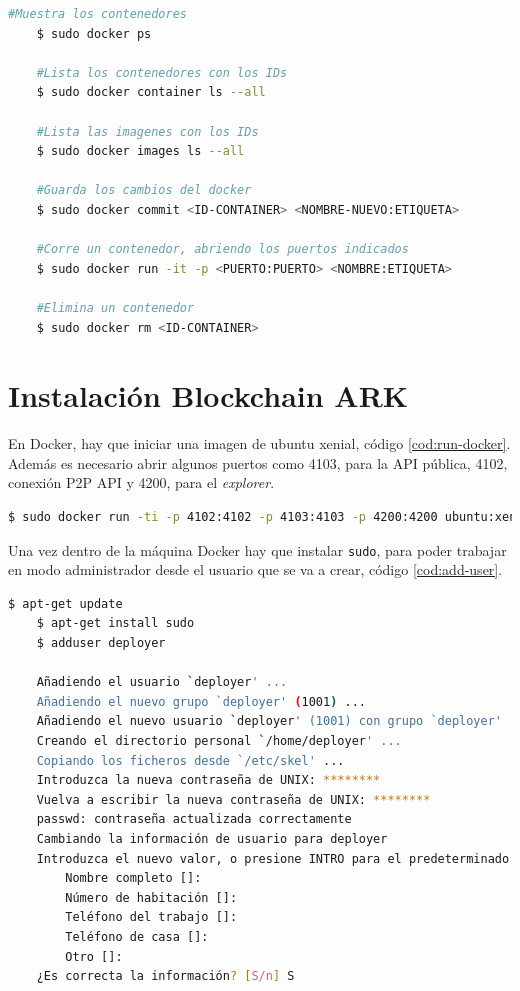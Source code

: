 \begin{lstlisting}[language=Bash,caption=Comandos útiles de Docker, label=cod:cm-docker]
	#Muestra los contenedores
	$ sudo docker ps

	#Lista los contenedores con los IDs
	$ sudo docker container ls --all

	#Lista las imagenes con los IDs
	$ sudo docker images ls --all 

	#Guarda los cambios del docker
	$ sudo docker commit <ID-CONTAINER> <NOMBRE-NUEVO:ETIQUETA>

	#Corre un contenedor, abriendo los puertos indicados
	$ sudo docker run -it -p <PUERTO:PUERTO> <NOMBRE:ETIQUETA>

	#Elimina un contenedor
	$ sudo docker rm <ID-CONTAINER>
\end{lstlisting}

\section{Instalación Blockchain ARK}

En Docker, hay que iniciar una imagen de ubuntu xenial, código \ref{cod:run-docker}. Además es necesario abrir algunos puertos como 4103, para la API pública, 4102, conexión P2P API y 4200, para el \textit{explorer}.\\

\begin{lstlisting}[language=Bash,caption=Instalación \textit{blockchain}. Parte I, label=cod:run-docker, style=Consola]
	$ sudo docker run -ti -p 4102:4102 -p 4103:4103 -p 4200:4200 ubuntu:xenial
\end{lstlisting}

Una vez dentro de la máquina Docker hay que instalar \texttt{sudo}, para poder trabajar en modo administrador desde el usuario que se va a crear, código \ref{cod:add-user}.\\

\begin{lstlisting}[language=Bash,caption=Instalación \textit{blockchain}. Parte II, label=cod:add-user, style=Consola]
	$ apt-get update
	$ apt-get install sudo
	$ adduser deployer

	Añadiendo el usuario `deployer' ...
	Añadiendo el nuevo grupo `deployer' (1001) ...
	Añadiendo el nuevo usuario `deployer' (1001) con grupo `deployer' ...
	Creando el directorio personal `/home/deployer' ...
	Copiando los ficheros desde `/etc/skel' ...
	Introduzca la nueva contraseña de UNIX: ********
	Vuelva a escribir la nueva contraseña de UNIX: ********
	passwd: contraseña actualizada correctamente
	Cambiando la información de usuario para deployer
	Introduzca el nuevo valor, o presione INTRO para el predeterminado
		Nombre completo []: 
		Número de habitación []: 
		Teléfono del trabajo []: 
		Teléfono de casa []: 
		Otro []: 
	¿Es correcta la información? [S/n] S
\end{lstlisting}

